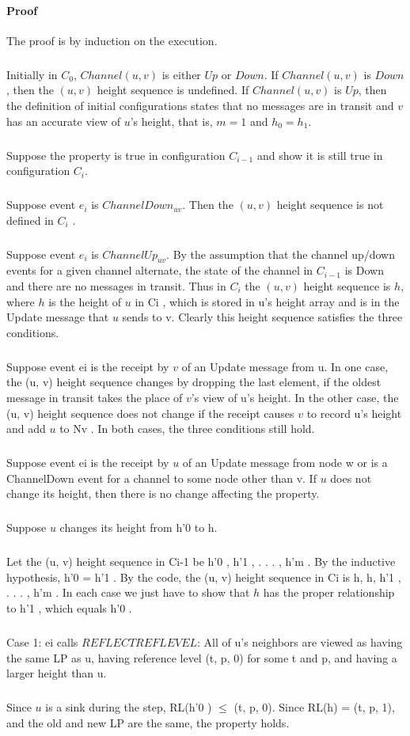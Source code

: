 \paragraph{Proof}The proof is by induction on the execution.
\subparagraph{}Initially in $C_0$, $Channel(u, v)$ is either $Up$ or $Down$. If $Channel(u, v)$ is $Down$, then the $(u, v)$ height sequence is undefined. If $Channel(u, v)$ is $Up$, then the definition of initial configurations states that no messages are in transit and $v$ has an accurate view of $u$'s height, that is, $m = 1$ and $h_0 = h_1$.
\subparagraph{}Suppose the property is true in configuration $C_{i-1}$ and show it is still true in configuration $C_i$.
\subparagraph{}Suppose event $e_i$ is $ChannelDown_{uv}$. Then the $(u, v)$ height sequence is not defined in $C_i$ .
\subparagraph{}Suppose event $e_i$ is $ChannelUp_{uv}$. By the assumption that the channel up/down events for a given channel alternate, the state of the channel in $C_{i-1}$ is Down and there are no messages in transit. Thus in $C_i$ the $(u, v)$ height sequence is $h$, where $h$ is the height of $u$ in Ci , which is stored in u's height array and is in the Update message that $u$ sends to v. Clearly this height sequence satisfies the three conditions.
\subparagraph{}Suppose event ei is the receipt by $v$ of an Update message from u. In one case, the (u, v) height sequence changes by dropping the last element, if the oldest message in transit takes the place of $v$'s view of u's height. In the other case, the (u, v) height sequence does not change if the receipt causes $v$ to record u's height and add $u$ to Nv . In both cases, the three conditions still hold.
\subparagraph{}Suppose event ei is the receipt by $u$ of an Update message from node w or is a ChannelDown event for a channel to some node other than v. If $u$ does not change its height, then there is no change affecting the property.
\subparagraph{}Suppose $u$ changes its height from h'0 to h.
\subparagraph{}Let the (u, v) height sequence in Ci-1 be h'0 , h'1 , . . . , h'm . By the inductive hypothesis, h'0 = h'1 . By the code, the (u, v) height sequence in Ci is h, h, h'1 , . . . , h'm . In each case we just have to show that $h$ has the proper relationship to h'1 , which equals h'0 .
\subparagraph{}Case 1: ei calls $REFLECTREFLEVEL$: All of u's neighbors are viewed as having the same LP as u, having reference level (t, p, 0) for some t and p, and having a larger height than u.
\subparagraph{}Since $u$ is a sink during the step, RL(h'0 ) $\leq$ (t, p, 0). Since RL(h) = (t, p, 1), and the old and new LP are the same, the property holds.
